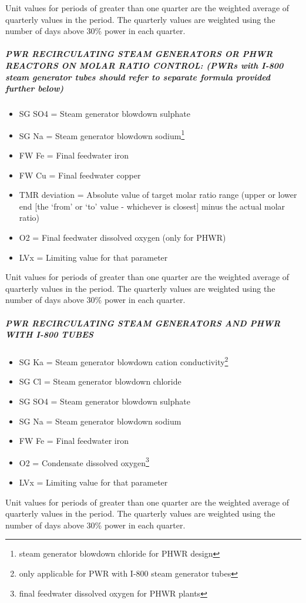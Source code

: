 \begin{itemize}
Unit values for periods of greater than one quarter are the weighted
average of quarterly values in the period. The quarterly values are
weighted using the number of days above 30\% power in each quarter.

\subparagraph{PWR RECIRCULATING STEAM GENERATORS OR PHWR REACTORS ON
  MOLAR RATIO CONTROL:  (PWRs with I-800 steam generator tubes should
  refer to separate formula provided further below)}
\begin{itemize}
\item SG SO4		=	Steam generator blowdown sulphate
\item SG Na		=	Steam generator blowdown sodium\footnote{steam generator blowdown chloride for PHWR design}
\item FW Fe		=	Final feedwater iron
\item FW Cu		=	Final feedwater copper
\item TMR deviation	=	Absolute value of target molar ratio range (upper or lower end [the ‘from’ or
        ‘to’ value - whichever is closest] minus the actual molar ratio)
      \item O2		=	Final feedwater dissolved oxygen (only for PHWR)
      \item LVx		=	Limiting value for that parameter
      \end{itemize}

      Unit values for periods of greater than one quarter are the
      weighted average of quarterly values in the period. The
      quarterly values are weighted using the number of days above
      30\% power in each quarter.

\subparagraph{PWR RECIRCULATING STEAM GENERATORS AND PHWR WITH I-800
  TUBES}
\begin{itemize}
\item SG Ka		=	Steam generator blowdown cation conductivity\footnote{only applicable for PWR with I-800 steam generator tubes}
\item SG Cl		=	Steam generator blowdown chloride
\item SG SO4		=	Steam generator blowdown sulphate
\item SG Na		=	Steam generator blowdown sodium
\item FW Fe		=	Final feedwater iron
\item O2		=	Condensate dissolved oxygen\footnote{final feedwater dissolved oxygen for PHWR plants}
\item LVx		=	Limiting value for that parameter
\end{itemize}
Unit values for periods of greater than one quarter are the weighted
average of quarterly values in the period. The quarterly values are
weighted using the number of days above 30\% power in each quarter.


\end{itemize}

